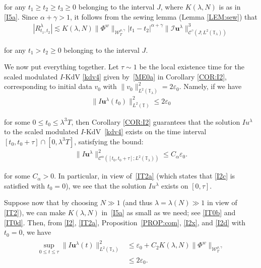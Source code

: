 \documentclass[letterpaper, 11pt,  reqno]{amsart}
\newcommand{\1}{\hspace{0.5mm}\text{I}\hspace{0.5mm}}
\newcommand{\I}{\mathcal{I}}
\newcommand{\noi}{\noindent}
\newcommand{\T}{\mathbb{T}}
\newcommand{\CC}{\mathcal{C}}
\newcommand{\al}{\alpha}
\newcommand{\eps}{\varepsilon}
\newcommand{\g}{\gamma}
\newcommand{\ld}{\lambda}
\newcommand{\les}{\lesssim}
\newcommand{\W}{\mathcal{W}}
\newcommand{\uu}{\mathbf{u}}
\numberwithin{equation}{section}
\numberwithin{theorem}{section}
\begin{document}
\noi
for any 
$t_1 \ge   t_2\ge t_3\ge 0$
belonging to the interval $J$, 
where $K(\ld, N)$ is as in \eqref{I5a}.
Since $\al + \g > 1$, 
it follows from the sewing lemma 
(Lemma \ref{LEM:sew}) 
that 
\begin{align}
|  R^\ld_{t_1,t_2} | \les 
K(\ld, N)   \|  \Phi^{w}  \|_{\W_{T}^{\rho, \g}}   
|t_1-t_2|^{\al + \g}  \|\I \uu^\ld \|^3_{\CC^\g (J;L^2(\T_\ld))}
\label{I2x}
\end{align}

\noi
for any 
$t_1 >   t_2\ge 0$
belonging to the interval $J$.



We now put everything together.
Let   $\tau \sim 1$ be  the local existence time
for the scaled modulated $I$-KdV \eqref{kdv4}
given by~\eqref{ME0a} in Corollary \ref{COR:I2}, 
corresponding to initial data $v_0$ with 
$\|v_0 \|_{L^2(\T_\ld)}^2
= 2\eps_0$.
Namely, if we have 
\begin{align}
 \|I\uu^\ld(t_0)\|_{L^2(\T)}^2 \le 2\eps_0
\label{I2c}
\end{align}


\noi
for some 
 $0 \le t_0 \le \ld^3T$, 
then Corollary \ref{COR:I2}
guarantees that the solution $Iu^\ld$ to the scaled modulated $I$-KdV~\eqref{kdv4} exists on 
the time interval $[t_0, t_0 + \tau]\cap [0, \ld^3 T]$, satisfying the bound:
\begin{align}
 \| I\uu^\ld \|_{\CC^\al ([t_0, t_0 + \tau];L^2(\T_\ld))}^2\le C_\al\eps_0.
\label{I2d}
\end{align}

\noi
for some $C_\al > 0$.
In particular, in view of~\eqref{IT2a} (which states that \eqref{I2c} is satisfied with $t_0 = 0$), 
we see that 
 the solution $Iu^\ld$  exists on $[0, \tau]$.



Suppose now that by choosing $N \gg 1$
(and thus $\ld = \ld(N) \gg1$
in view of \eqref{IT2}), 
we can make 
 $K(\ld, N)$  in~\eqref{I5a}
as small as we need;
see \eqref{IT0b} and \eqref{IT0d}.
Then,  
from 
\eqref{I2}, \eqref{IT2a}, 
Proposition~\ref{PROP:com}, 
 \eqref{I2x}, 
and \eqref{I2d} with $t_0 = 0$,  
 we have 
\begin{align}
\begin{split}
 \sup_{0\le t\le \tau} \| I \uu^\ld(t) \|^2_{L^2(\T_\ld)} 
&  \le \eps_0 + 
C_2 K(\ld, N)   \|  \Phi^{w}  \|_{\W_{T}^{\rho, \g}}   \\
& \le 2\eps_0.
\end{split}
\label{I2e}
\end{align}
\end{document}

